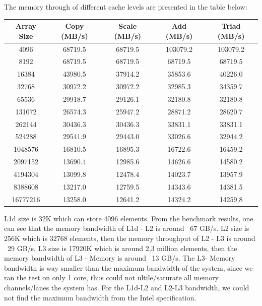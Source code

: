 \documentclass[article]{scrartcl}
\begin{document}
The memory through of different cache levels are presented in the table below:
\begin{center}
  \begin{tabular}{ c|c|c|c|c } 
    Array Size & Copy (MB/s) & Scale (MB/s) & Add (MB/s) & Triad (MB/s) \\
    \hline
    4096    & 68719.5&         68719.5&         103079.2       & 103079.2 \\
    8192    & 68719.5&         68719.5&         68719.5        & 68719.5 \\
    16384   & 43980.5&         37914.2&         35853.6        & 40226.0 \\
    32768   & 30972.2&         30972.2&         32985.3        & 34359.7 \\
    65536   & 29918.7&         29126.1&         32180.8        & 32180.8 \\
    131072  & 26574.3&         25947.2&         28871.2        & 28620.7 \\ 
    262144  & 30436.3&         30436.3&         33831.1        & 33831.1 \\
    524288  & 29541.9&         29443.0&         33026.6        & 32944.2 \\
    1048576 &         16810.5        & 16895.3       &  16722.6&         16459.2\\
    2097152 &         13690.4        & 12985.6       &  14626.6&         14580.2\\
    4194304 &         13099.8        & 12478.4       &  14023.7&         13957.9\\
    8388608 &         13217.0        & 12759.5       &  14343.6&         14381.5\\
    16777216&         13258.0        & 12641.2       &  14324.2&         14259.8\\
  \end{tabular}
\end{center}

L1d size is 32K which can store 4096 elements. From the benchmark results, one can see that the memory bandwidth of L1d - L2 is around ~67 GB/s. L2 size is 256K which is 32768 elements, then the memory throughput of L2 - L3 is around ~29 GB/s. L3 size is 17920K which is around 2,3 million elements, then the memory bandwidth of L3 - Memory is around ~13 GB/s. The L3- Memory bandwidth is way smaller than the maximum bandwidth of the system, since we ran the test on only 1 core, thus could not ultile/saturate all memory channels/lanes the system has. For the L1d-L2 and L2-L3 bandwidth, we could not find the maximum bandwidth from the Intel specification.
\end{document}
